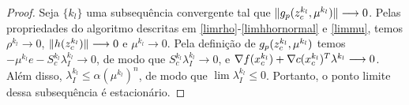 \begin{proof}
Seja $\{k_l\}$ uma subsequência convergente tal que
$\Vert g_p(z_c^{k_l},\mu^{k_l})\Vert \longrightarrow 0$. Pelas propriedades do
algoritmo descritas em \eqref{limrho}-\eqref{limhhornormal} e \eqref{limmu}, temos
$\rho^{k_l} \longrightarrow 0$, $\Vert h(z_c^{k_l})\Vert \longrightarrow 0$ e
$\mu^{k_l} \longrightarrow 0$. Pela definição de $g_p(z_c^{k_l},\mu^{k_l})$ temos
$-\mu^{k_l}e - S_c^{k_l}\lambda_I^{k_l} \longrightarrow 0$, de modo que
$S_c^{k_l}\lambda_I^{k_l} \longrightarrow 0$, e $\nabla f(x_c^{k_l}) + \nabla
c(x_c^{k_l})^T\lambda^{k_l} \longrightarrow 0$. Além disso, $\lambda_I^{k_l} \leq
\alpha(\mu^{k_l})^n$, de modo que $\lim \lambda_I^{k_l} \leq 0$. Portanto, o ponto
limite dessa subsequência é estacionário.  \end{proof}

